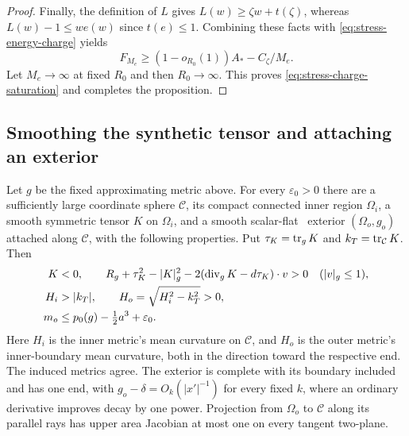 \begin{proof}
Finally, the definition of $L$ gives $L(w)\ge\zeta w+t(\zeta)$,
whereas $L(w)-1\le we(w)$ since $t(e)\le1$.  Combining these facts
with \eqref{eq:stress-energy-charge} yields
\begin{equation}
 F_{M_e}\ge(1-o_{R_0}(1))A_*-C_\zeta/M_e.
 \label{eq:stress-charge-lower-bound}
\end{equation}
Let $M_e\to\infty$ at fixed $R_0$ and then $R_0\to\infty$.
This proves \eqref{eq:stress-charge-saturation} and completes the
proposition.
\end{proof}

\subsection{Smoothing the synthetic tensor and attaching an exterior}

\begin{proposition}
\label{prop:af-attachment}
Let $g$ be the fixed approximating metric above.  For every
$\varepsilon_0>0$ there are a sufficiently large coordinate sphere
$\mathcal C$, its compact connected inner region $\Omega_i$, a
smooth symmetric tensor $K$ on $\Omega_i$, and a smooth scalar-flat
\AF\ exterior $(\Omega_o,g_o)$ attached along $\mathcal C$, with
the following properties.  Put $\tau_K=\operatorname{tr}_g K$ and
$k_T=\operatorname{tr}_{\mathcal C}K$.  Then
\begin{align}
 K&<0,\qquad
 R_g+\tau_K^2-|K|_g^2
   -2(\operatorname{div}_gK-d\tau_K)\cdot v>0
       &&(|v|_g\le1),
 \label{eq:stress-synthetic-DEC}\\
 H_i&>|k_T|,\qquad
 H_o=\sqrt{H_i^2-k_T^2}>0,
 \label{eq:stress-matching-curvatures}\\
 m_o&\le p_0(g)-\tfrac12 a^3+\varepsilon_0.
 \label{eq:stress-attachment-budget}
\end{align}
Here $H_i$ is the inner metric's mean curvature on $\mathcal C$,
and $H_o$ is the outer metric's inner-boundary mean curvature, both
in the direction toward the respective end.  The induced metrics
agree.  The exterior is complete with its boundary included and
has one end, with $g_o-\delta=O_k(|x'|^{-1})$ for every fixed $k$,
where an ordinary derivative improves decay by one power.
Projection from $\Omega_o$ to $\mathcal C$ along its parallel rays
has upper area Jacobian at most one on every tangent two-plane.
\end{proposition}

